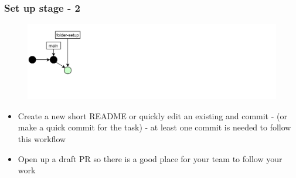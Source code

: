 \documentclass[aspectratio=169]{beamer} %
\begin{document}
\begin{frame}
	\frametitle{Set up stage - 2}

	\vspace{-.5cm}
	\begin{minipage}[t][5cm][t]{\textwidth}
		\begin{figure}
			\centering
			\includegraphics[width=\textwidth]{./img/dime-gitflow-network-1-1.png}
		\end{figure}
	\end{minipage}

	\vspace{-.5cm}
	\begin{minipage}[t][5cm][t]{\textwidth}
		\begin{itemize}
			\setlength\itemsep{.5em}
			\item Create a new short README or
			quickly edit an existing and commit -
			(or make a quick commit for the task) -
			at least one commit is needed to follow this workflow
			\item Open up a draft PR so there is a good place
			for your team to follow your work
		\end{itemize}
	\end{minipage}

\end{frame}
\end{document}
